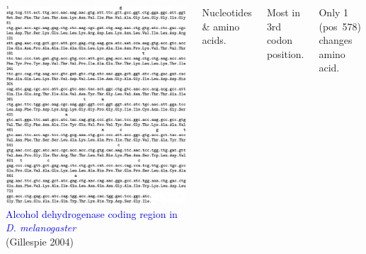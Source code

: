 \documentclass[handout]{beamer}
\begin{document}
\begin{frame}
\begin{columns}
\includegraphics[width=\textwidth]{adhseq.png}
\textcolor{blue}{Alcohol dehydrogenase coding region in \emph{D. melanogaster}}\\
{\centering
\scriptsize(Gillespie 2004)\\}

Nucleotides \& amino acids.\\

\medskip

Most in 3rd codon position.

\medskip

Only 1 (pos~578) changes amino acid.
\end{columns}
\end{frame}
\end{document}
